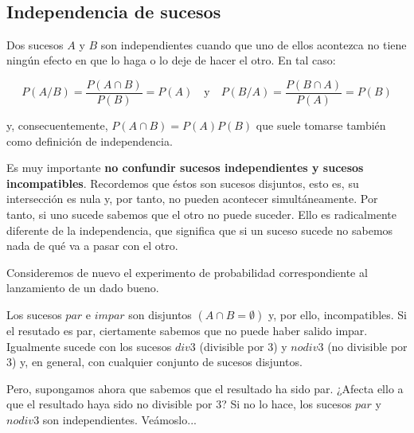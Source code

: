 \documentclass[11pt]{article}
\begin{document}

    \begin{center}
    \end{center}
    { \hspace*{\fill} \\}


    \subsection*{Independencia de sucesos}\label{independencia-de-sucesos}

Dos sucesos \(A\) y \(B\) son independientes cuando que uno de ellos
acontezca no tiene ningún efecto en que lo haga o lo deje de hacer el
otro. En tal caso:

\[P(A/B) =\frac{P(A\cap B)}{P(B)}= P(A) \quad \text{y} \quad P(B/A)=\frac{P(B\cap A)}{P(A)}=P(B)\]

y, consecuentemente, \(P(A\cap B) = P(A)P(B)\) que suele tomarse también
como definición de independencia.

Es muy importante \textbf{no confundir sucesos independientes y sucesos
incompatibles}. Recordemos que éstos son sucesos disjuntos, esto es, su
intersección es nula y, por tanto, no pueden acontecer simultáneamente.
Por tanto, si uno sucede sabemos que el otro no puede suceder. Ello es
radicalmente diferente de la independencia, que significa que si un
suceso sucede no sabemos nada de qué va a pasar con el otro.


    Consideremos de nuevo el experimento de probabilidad correspondiente al
lanzamiento de un dado bueno.

Los sucesos \(par\) e \(impar\) son disjuntos
\(\left(A \cap B = \emptyset \right)\) y, por ello, incompatibles. Si el
resutado es par, ciertamente sabemos que no puede haber salido impar.
Igualmente sucede con los sucesos \(div3\) (divisible por 3) y
\(nodiv3\) (no divisible por 3) y, en general, con cualquier conjunto de
sucesos disjuntos.

Pero, supongamos ahora que sabemos que el resultado ha sido par. ¿Afecta
ello a que el resultado haya sido no divisible por 3? Si no lo hace, los
sucesos \(par\) y \(nodiv3\) son independientes. Veámoslo...
\end{document}
